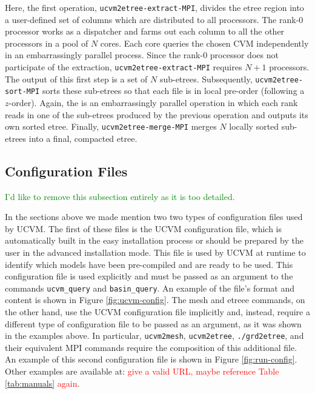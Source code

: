 Here, the first operation, \texttt{ucvm2etree-extract-MPI}, divides the etree region into a user-defined set of columns which are distributed to all processors. The rank-0 processor works as a dispatcher and farms out each column to all the other processors in a pool of $N$ cores. Each core queries the chosen CVM independently in an embarrassingly parallel process. Since the rank-0 processor does not participate of the extraction, \texttt{ucvm2etree-extract-MPI} requires $N+1$ processors. The output of this first step is a set of $N$ sub-etrees. Subsequently, \texttt{ucvm2etree-sort-MPI} sorts these sub-etrees so that each file is in local pre-order (following a $z$-order). Again, the is an embarrassingly parallel operation in which each rank reads in one of the sub-etrees produced by the previous operation and outputs its own sorted etree. Finally, \texttt{ucvm2etree-merge-MPI} merges $N$ locally sorted sub-etrees into a final, compacted etree.

\subsection{Configuration Files}

\textcolor{green}{I'd like to remove this subsection entirely as it is too detailed.}

In the sections above we made mention two two types of configuration files used by UCVM. The first of these files is the UCVM configuration file, which is automatically built in the easy installation process or should be prepared by the user in the advanced installation mode. This file is used by UCVM at runtime to identify which models have been pre-compiled and are ready to be used. This configuration file is used explicitly and must be passed as an argument to the commands \texttt{ucvm\_query} and \texttt{basin\_query}. An example of the file's format and content is shown in Figure \ref{fig:ucvm-config}. The mesh and etreee commands, on the other hand, use the UCVM configuration file implicitly and, instead, require a different type of configuration file to be passed as an argument, as it was shown in the examples above. In particular, \texttt{ucvm2mesh}, \texttt{ucvm2etree}, \texttt{./grd2etree}, and their equivalent MPI commands require the composition of this additional file. An example of this second configuration file is shown in Figure \ref{fig:run-config}. Other examples are available at: \textcolor{red}{give a valid URL, maybe reference Table \ref{tab:manuals} again}.


